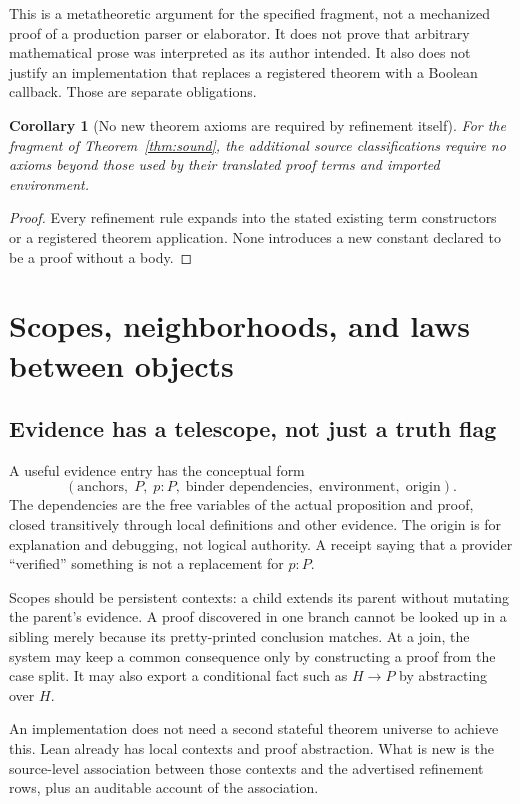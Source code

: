 \documentclass[11pt,letterpaper]{article}
\newtheorem{corollary}[theorem]{Corollary}
\theoremstyle{definition}
\theoremstyle{remark}
\begin{document}
This is a metatheoretic argument for the specified fragment, not a mechanized
proof of a production parser or elaborator. It does not prove that arbitrary
mathematical prose was interpreted as its author intended. It also does not
justify an implementation that replaces a registered theorem with a Boolean
callback. Those are separate obligations.

\begin{corollary}[No new theorem axioms are required by refinement itself]
For the fragment of Theorem~\ref{thm:sound}, the additional source classifications
require no axioms beyond those used by their translated proof terms and imported
environment.
\end{corollary}
\begin{proof}
Every refinement rule expands into the stated existing term constructors or a
registered theorem application. None introduces a new constant declared to be a
proof without a body.
\end{proof}

\section{Scopes, neighborhoods, and laws between objects}\label{sec:scope}

\subsection{Evidence has a telescope, not just a truth flag}
A useful evidence entry has the conceptual form
\[
(\text{anchors},\;P,\;p:P,\;\text{binder dependencies},\;
\text{environment},\;\text{origin}).
\tag{4}
\]
The dependencies are the free variables of the actual proposition and proof,
closed transitively through local definitions and other evidence. The origin is
for explanation and debugging, not logical authority. A receipt saying that a
provider ``verified'' something is not a replacement for $p:P$.

Scopes should be persistent contexts: a child extends its parent without
mutating the parent's evidence. A proof discovered in one branch cannot be
looked up in a sibling merely because its pretty-printed conclusion matches.
At a join, the system may keep a common consequence only by constructing a proof
from the case split. It may also export a conditional fact such as $H\to P$ by
abstracting over $H$.

An implementation does not need a second stateful theorem universe to achieve
this. Lean already has local contexts and proof abstraction. What is new is the
source-level association between those contexts and the advertised refinement
rows, plus an auditable account of the association.
\end{document}
